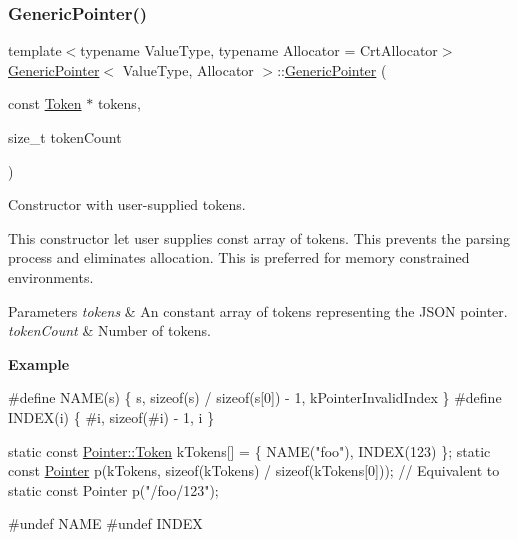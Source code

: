 \subsubsection{\texorpdfstring{Generic\+Pointer()}{GenericPointer()}\hspace{0.1cm}{\footnotesize\ttfamily [3/3]}}
{\footnotesize\ttfamily template$<$typename Value\+Type, typename Allocator = Crt\+Allocator$>$ \\
\hyperlink{classGenericPointer}{Generic\+Pointer}$<$ Value\+Type, Allocator $>$\+::\hyperlink{classGenericPointer}{Generic\+Pointer} (\begin{DoxyParamCaption}\item[{const \hyperlink{structGenericPointer_1_1Token}{Token} $\ast$}]{tokens,  }\item[{size\+\_\+t}]{token\+Count }\end{DoxyParamCaption})\hspace{0.3cm}{\ttfamily [inline]}}



Constructor with user-\/supplied tokens. 

This constructor let user supplies const array of tokens. This prevents the parsing process and eliminates allocation. This is preferred for memory constrained environments.


\begin{DoxyParams}{Parameters}
{\em tokens} & An constant array of tokens representing the J\+S\+ON pointer. \\
\hline
{\em token\+Count} & Number of tokens.\\
\hline
\end{DoxyParams}
{\bfseries Example} 
\begin{DoxyCode}
\textcolor{preprocessor}{#define NAME(s) \{ s, sizeof(s) / sizeof(s[0]) - 1, kPointerInvalidIndex \}}
\textcolor{preprocessor}{#define INDEX(i) \{ #i, sizeof(#i) - 1, i \}}

\textcolor{keyword}{static} \textcolor{keyword}{const} \hyperlink{structGenericPointer_1_1Token}{Pointer::Token} kTokens[] = \{ NAME(\textcolor{stringliteral}{"foo"}), INDEX(123) \};
\textcolor{keyword}{static} \textcolor{keyword}{const} \hyperlink{classGenericPointer}{Pointer} p(kTokens, \textcolor{keyword}{sizeof}(kTokens) / \textcolor{keyword}{sizeof}(kTokens[0]));
\textcolor{comment}{// Equivalent to static const Pointer p("/foo/123");}

\textcolor{preprocessor}{#undef NAME}
\textcolor{preprocessor}{#undef INDEX}
\end{DoxyCode}
 

